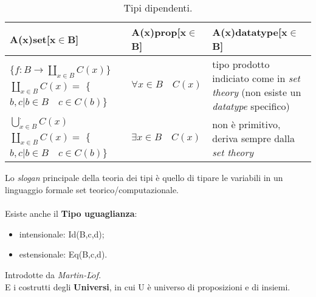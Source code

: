 \begin{table}[H]
\centering
\begin{tabularx}{\textwidth}{p{3.8cm}XX}
\hline 
\rowcolor{amethyst}
{\color[HTML]{FFFFFF}\textbf{A(x)set[x$\in$B]}} & {\color[HTML]{FFFFFF} \textbf{A(x)prop[x$\in$B]}} & {\color[HTML]{FFFFFF}\textbf{A(x)datatype[x$\in$B]}}\\
\hline\hline
\centering \scriptsize{\{$\displaystyle f: B \rightarrow \displaystyle\coprod\limits_{x \in B} C(x)$\}} \scriptsize{$\displaystyle\coprod\limits_{x \in B} C(x) =$ \{$b,c | b\in B \quad c\in C(b)$\}}& \centering \small{$\displaystyle \forall {x \in B} \quad C(x)$} & tipo prodotto indiciato come in \textit{set theory} (non esiste un \textit{datatype} specifico)\\
\hline
\centering \scriptsize{$\displaystyle\bigcup\limits_{x \in B}^. C(x)$} \qquad \qquad \qquad \scriptsize{$\displaystyle\coprod\limits_{x \in B} C(x) =$ \{$b,c | b\in B \quad c\in C(b)$\}} & \centering \small{$\displaystyle \exists{x \in B} \quad C(x)$} & non \`e primitivo, deriva sempre dalla \textit{set theory}\\
\end{tabularx}
\caption{\label{tab:tipi-dipendenti}Tipi dipendenti.} 
\end{table}
\noindent
Lo \textit{slogan} principale della teoria dei tipi \`e quello di tipare le variabili in un linguaggio formale set teorico/computazionale.\\\\
Esiste anche il \textbf{Tipo uguaglianza}:
\begin{itemize}
\item intensionale: Id(B,c,d);
\item estensionale: Eq(B,c,d).
\end{itemize}
\noindent
Introdotte da \textit{Martin-L$\ddot{o}$f}.\\
E i costrutti degli \textbf{Universi}, in cui U \`e universo di proposizioni e di insiemi.
